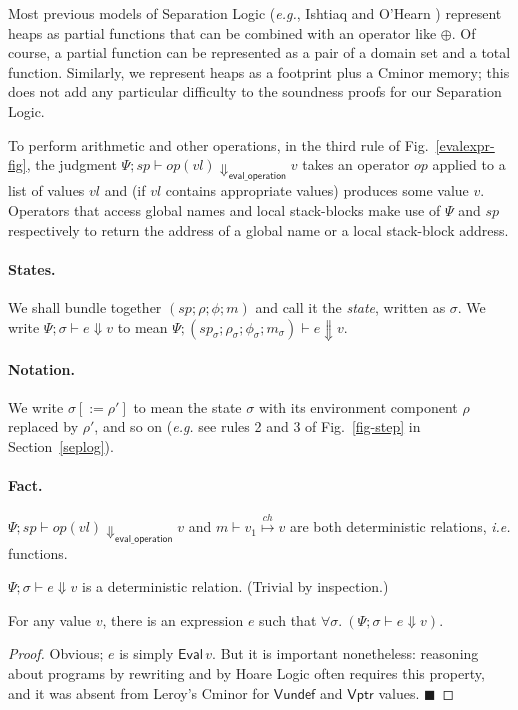 \documentclass{llncs}
\newcommand{\cminor}{Cminor}
\newcommand{\tyface}[1]{\ensuremath{\mathsf{#1}}}
\newcommand{\Vundef}{\tyface{Vundef}}
\newcommand{\Vptr}{\tyface{Vptr}}
\newcommand{\Eval}{\tyface{Eval}}
\newcommand{\fmap}{\Psi}
\newcommand{\evalexpr}[7]{#1;(#2;#3;#4;#5) \vdash #6 \Downarrow #7}
\newcommand{\evalexp}[3]{\fmap; #1 \vdash #2 \Downarrow #3}
\newcommand{\evaloperation}[5]{#1;#2 \vdash #3(#4) \Downarrow_\tyface{eval\_operation} #5}
\newcommand{\loadv}[4]{#1\vdash #2\stackrel{#3}{\mapsto}#4}
\begin{document}
Most previous models of Separation Logic (\textit{e.g.}, Ishtiaq and O'Hearn
\cite{ishtiaq01}) represent heaps as partial functions
that can be combined with an operator like $\oplus$.  Of course,
a partial function can be represented as a pair of a domain set and
a total function.  Similarly, we represent heaps as a footprint plus a 
\cminor{} memory; this does not add any particular difficulty to the soundness proofs for
our Separation Logic.

To perform arithmetic and other operations,
in the third rule of Fig.~\ref{evalexpr-fig}, the judgment
$\evaloperation{\fmap}{\mathit{sp}}{\mathit{op}}{\mathit{vl}}{v}$
takes an operator $\mathit{op}$ applied to a list of values $\mathit{vl}$
and (if $\mathit{vl}$ contains appropriate values)
produces some value $v$.  
Operators 
that access global names and local stack-blocks
make use of $\fmap$ and $\mathit{sp}$ respectively to
return the address of a global name or a local stack-block 
address.

\paragraph{States.}
We shall bundle together $(\mathit{sp};\rho;\phi;m)$
and call it the \emph{state}, written as $\sigma$.
We write $\evalexp{\sigma}{e}{v}$ to mean
$\evalexpr{\fmap}{\mathit{sp}_\sigma}{\rho_\sigma}{\phi_\sigma}{m_\sigma}{e}{v}$.

\paragraph{Notation.}
We write $\sigma[:=\rho']$ to mean the state $\sigma$
with its environment component $\rho$ replaced by $\rho'$, and so on
(\textit{e.g.} see rules 2 and 3 of Fig.~\ref{fig-step} in Section~\ref{seplog}).



\paragraph{Fact.} 
$\evaloperation{\fmap}{\mathit{sp}}{\mathit{op}}{\mathit{vl}}{v}$
and $\loadv{m}{v_1}{\mathit{ch}}{v}$ are both deterministic
relations, \textit{i.e.} functions.


\begin{lemma}
$\evalexp{\sigma}{e}{v}$
is a deterministic relation. (Trivial by inspection.)
\end{lemma}

\begin{lemma}
For any value $v$, there is an expression $e$ such that
$\forall\sigma.~(\evalexp{\sigma}{e}{v})$.
\vspace{-3pt}
\begin{proof} 
Obvious; $e$ is simply $\Eval\,v$.
But it is important nonetheless: reasoning about programs by rewriting
and by Hoare Logic often requires this property,
and it was absent from Leroy's \cminor{} for
\Vundef{} and \Vptr{} values.
$\blacksquare$
\end{proof}\end{lemma}
\end{document}
